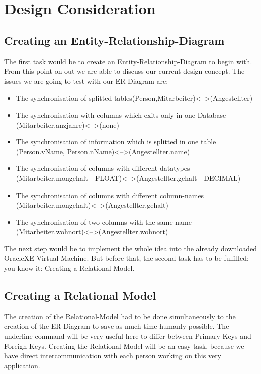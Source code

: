 \documentclass[11pt,a4paper]{article}
\begin{document}
\newpage
\section{Design Consideration}
\subsection{Creating an Entity-Relationship-Diagram}
The first task would be to create an Entity-Relationship-Diagram to begin with. From this point on out we are able to discuss our current design concept. The issues we are going to test with our ER-Diagram are:

\begin{itemize}
	\item The synchronisation of splitted tables\newline  (Person,Mitarbeiter)\textless--\textgreater  (Angestellter)
	\item The synchronisation with columns which exits only in one Database \newline (Mitarbeiter.anzjahre)\textless--\textgreater (none)
	\item The synchronisation of information which is splitted in one table \newline (Person.vName, Person.nName)\textless--\textgreater (Angestellter.name)
	\item The synchronisation of columns with different datatypes \newline (Mitarbeiter.mongehalt - FLOAT)\textless--\textgreater (Angestellter.gehalt - DECIMAL)
	\item The synchronisation of columns with different column-names \newline (Mitarbeiter.mongehalt)\textless--\textgreater (Angestellter.gehalt)
	\item The synchronisation of two columns with the same name \newline (Mitarbeiter.wohnort)\textless--\textgreater (Angestellter.wohnort)
	
\end{itemize}

 \noindent The next step would be to implement the whole idea into the already downloaded OracleXE Virtual Machine. But before that, the second task has to be fulfilled: you know it: Creating a Relational Model.
\subsection{Creating a Relational Model}
The creation of the Relational-Model had to be done simultaneously to the creation of the ER-Diagram to save as much time humanly possible. The underline command will be very useful here to differ between Primary Keys and Foreign Keys. Creating the Relational Model will be an easy task, because we have direct intercommunication with each person working on this very application.
\end{document}
